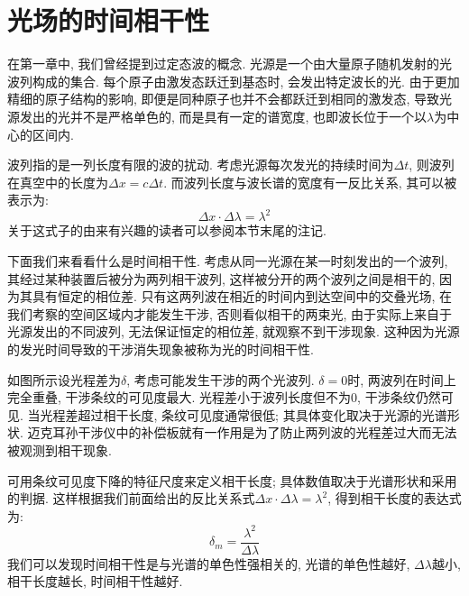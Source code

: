 \section{光场的时间相干性}

在第一章中, 我们曾经提到过定态波的概念. 光源是一个由大量原子随机发射的光波列构成的集合. 每个原子由激发态跃迁到基态时, 会发出特定波长的光. 由于更加精细的原子结构的影响, 即便是同种原子也并不会都跃迁到相同的激发态, 导致光源发出的光并不是严格单色的, 而是具有一定的谱宽度, 也即波长位于一个以$\lambda$为中心的区间内.


波列指的是一列长度有限的波的扰动. 考虑光源每次发光的持续时间为$\Delta t$, 则波列在真空中的长度为$\Delta x = c\Delta t$. 而波列长度与波长谱的宽度有一反比关系, 其可以被表示为:
\[
\Delta x \cdot \Delta \lambda = \lambda^2
\]
关于这式子的由来有兴趣的读者可以参阅本节末尾的注记.

下面我们来看看什么是时间相干性. 考虑从同一光源在某一时刻发出的一个波列, 其经过某种装置后被分为两列相干波列, 这样被分开的两个波列之间是相干的, 因为其具有恒定的相位差. 只有这两列波在相近的时间内到达空间中的交叠光场, 在我们考察的空间区域内才能发生干涉, 否则看似相干的两束光, 由于实际上来自于光源发出的不同波列, 无法保证恒定的相位差, 就观察不到干涉现象. 这种因为光源的发光时间导致的干涉消失现象被称为光的时间相干性.


如图所示设光程差为$\delta$, 考虑可能发生干涉的两个光波列. $\delta=0$时, 两波列在时间上完全重叠, 干涉条纹的可见度最大. 光程差小于波列长度但不为$0$, 干涉条纹仍然可见. 当光程差超过相干长度, 条纹可见度通常很低; 其具体变化取决于光源的光谱形状. 迈克耳孙干涉仪中的补偿板就有一作用是为了防止两列波的光程差过大而无法被观测到相干现象.

可用条纹可见度下降的特征尺度来定义相干长度; 具体数值取决于光谱形状和采用的判据. 这样根据我们前面给出的反比关系式$\Delta x \cdot \Delta \lambda = \lambda^2$, 得到相干长度的表达式为:
\[
\delta_m = \frac{\lambda^2}{\Delta \lambda}
\]
我们可以发现时间相干性是与光谱的单色性强相关的, 光谱的单色性越好, $\Delta \lambda$越小, 相干长度越长, 时间相干性越好.

